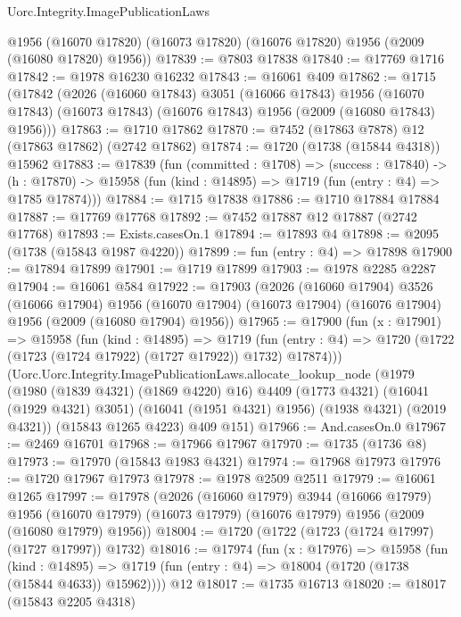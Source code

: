 \begin{lexlean}{Uorc.Integrity.ImagePublicationLaws}
\begin{coremodule}
      @1956
      (@16070 @17820)
      (@16073 @17820)
      (@16076 @17820)
      @1956
      (@2009 (@16080 @17820) @1956))
@17839 := @7803 @17838
@17840 := @17769 @1716
@17842 := @1978 @16230 @16232
@17843 := @16061 @409
@17862 := @1715
    (@17842
      (@2026
        (@16060 @17843)
        @3051
        (@16066 @17843)
        @1956
        (@16070 @17843)
        (@16073 @17843)
        (@16076 @17843)
        @1956
        (@2009 (@16080 @17843) @1956)))
@17863 := @1710 @17862
@17870 := @7452 (@17863 @7878) @12 (@17863 @17862) (@2742 @17862)
@17874 := @1720 (@1738 (@15844 @4318)) @15962
@17883 := @17839
    (fun (committed : @1708) =>
    (success : @17840) ->
    (h : @17870) -> @15958 (fun (kind : @14895) => @1719 (fun (entry : @4) => @1785 @17874)))
@17884 := @1715 @17838
@17886 := @1710 @17884 @17884
@17887 := @17769 @17768
@17892 := @7452 @17887 @12 @17887 (@2742 @17768)
@17893 := Exists.casesOn.{1}
@17894 := @17893 @4
@17898 := @2095 (@1738 (@15843 @1987 @4220))
@17899 := fun (entry : @4) => @17898
@17900 := @17894 @17899
@17901 := @1719 @17899
@17903 := @1978 @2285 @2287
@17904 := @16061 @584
@17922 := @17903
    (@2026
      (@16060 @17904)
      @3526
      (@16066 @17904)
      @1956
      (@16070 @17904)
      (@16073 @17904)
      (@16076 @17904)
      @1956
      (@2009 (@16080 @17904) @1956))
@17965 := @17900
    (fun (x : @17901) =>
    @15958
      (fun (kind : @14895) =>
      @1719 (fun (entry : @4) => @1720 (@1722 (@1723 (@1724 @17922) (@1727 @17922)) @1732) @17874)))
    (Uorc.Uorc.Integrity.ImagePublicationLaws.allocate_lookup_node
      (@1979
        (@1980 (@1839 @4321) (@1869 @4220) @16)
        @4409
        (@1773 @4321)
        (@16041 (@1929 @4321) @3051)
        (@16041 (@1951 @4321) @1956)
        (@1938 @4321)
        (@2019 @4321))
      (@15843 @1265 @4223)
      @409
      @151)
@17966 := And.casesOn.{0}
@17967 := @2469 @16701
@17968 := @17966 @17967
@17970 := @1735 (@1736 @8)
@17973 := @17970 (@15843 @1983 @4321)
@17974 := @17968 @17973
@17976 := @1720 @17967 @17973
@17978 := @1978 @2509 @2511
@17979 := @16061 @1265
@17997 := @17978
    (@2026
      (@16060 @17979)
      @3944
      (@16066 @17979)
      @1956
      (@16070 @17979)
      (@16073 @17979)
      (@16076 @17979)
      @1956
      (@2009 (@16080 @17979) @1956))
@18004 := @1720 (@1722 (@1723 (@1724 @17997) (@1727 @17997)) @1732)
@18016 := @17974
    (fun (x : @17976) =>
    @15958
      (fun (kind : @14895) =>
      @1719 (fun (entry : @4) => @18004 (@1720 (@1738 (@15844 @4633)) @15962))))
    @12
@18017 := @1735 @16713
@18020 := @18017 (@15843 @2205 @4318)

\end{coremodule}
\end{lexlean}
